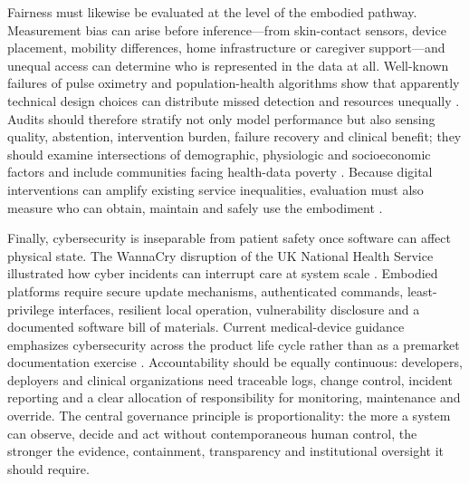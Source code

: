 Fairness must likewise be evaluated at the level of the embodied pathway. Measurement bias can arise before inference---from skin-contact sensors, device placement, mobility differences, home infrastructure or caregiver support---and unequal access can determine who is represented in the data at all. Well-known failures of pulse oximetry and population-health algorithms show that apparently technical design choices can distribute missed detection and resources unequally \cite{Sjoding2020PulseOximetry,Obermeyer2019RacialBias}. Audits should therefore stratify not only model performance but also sensing quality, abstention, intervention burden, failure recovery and clinical benefit; they should examine intersections of demographic, physiologic and socioeconomic factors and include communities facing health-data poverty \cite{Liu2022MedicalAlgorithmicAudit,Chen2023AlgorithmFairness,Ibrahim2021HealthDataPoverty}. Because digital interventions can amplify existing service inequalities, evaluation must also measure who can obtain, maintain and safely use the embodiment \cite{Veinot2018InformaticsInequality}.

Finally, cybersecurity is inseparable from patient safety once software can affect physical state. The WannaCry disruption of the UK National Health Service illustrated how cyber incidents can interrupt care at system scale \cite{Ghafur2019WannaCry}. Embodied platforms require secure update mechanisms, authenticated commands, least-privilege interfaces, resilient local operation, vulnerability disclosure and a documented software bill of materials. Current medical-device guidance emphasizes cybersecurity across the product life cycle rather than as a premarket documentation exercise \cite{FDA2026Cybersecurity}. Accountability should be equally continuous: developers, deployers and clinical organizations need traceable logs, change control, incident reporting and a clear allocation of responsibility for monitoring, maintenance and override. The central governance principle is proportionality: the more a system can observe, decide and act without contemporaneous human control, the stronger the evidence, containment, transparency and institutional oversight it should require.

